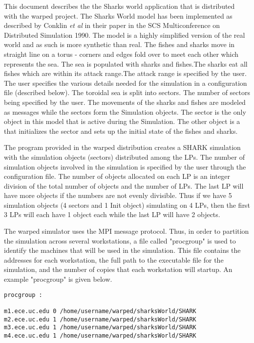 This document describes the the Sharks world application that is
distributed with the {\sc warped} project. The Sharks World model has been
implemented as described by Conklin {\it et al} in their paper in the SCS
Multiconference on Distributed Simulation 1990. The model is a highly
simplified version of the real world and as such is more synthetic than
real. The fishes and sharks move in straight line on a torus - corners and
edges fold over to meet each other which represents the sea. The sea is
populated with sharks and fishes.The sharks eat all fishes which are
within its attack range.The attack range is specified by the user. The user
specifies the various details needed for the simulation in a configuration
file (described below). The toroidal sea is split into sectors. The number
of sectors being specified by the user. The movements of the sharks and
fishes are modeled as messages while the sectors form the Simulation
objects. The sector is the only object in this model that is active during
the Simulation. The other object is a that initializes the sector and sets
up the initial state of the fishes and sharks.

The program provided in the {\sc warped} distribution creates a SHARK
simulation with the simulation objects (sectors) distributed among the
LPs. The number of simulation objects involved in the simulation is
specified by the user through the configuration file. The number of
objects allocated on each LP is an integer division of the total number of
objects and the number of LPs. The last LP will have more objects if the
numbers are not evenly divisible. Thus if we have 5 simulation objects (4
sectors and 1 Init object) simulating on 4 LPs, then the first 3 LPs will
each have 1 object each while the last LP will have 2 objects.

The {\sc warped} simulator uses the MPI message protocol.  Thus, in order
to partition the simulation across several workstations, a file called
"procgroup" is used to identify the machines that will be used in the
simulation.  This file contains the addresses for each workstation, the
full path to the executable file for the simulation, and the number of
copies that each workstation will startup.  An example "procgroup" is
given below.

\begin{verbatim}
procgroup :

m1.ece.uc.edu 0 /home/username/warped/sharksWorld/SHARK
m2.ece.uc.edu 1 /home/username/warped/sharksWorld/SHARK
m3.ece.uc.edu 1 /home/username/warped/sharksWorld/SHARK
m4.ece.uc.edu 1 /home/username/warped/sharksWorld/SHARK
\end{verbatim}

